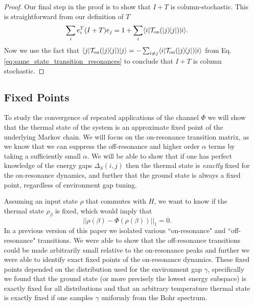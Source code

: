 \documentclass[
 amsmath,amssymb,
 aps,
onecolumn, 
nofootinbib]{revtex4-2}
\newcommand{\on}{\rm on}
\newcommand{\ket}[1]{|#1\rangle}
\newcommand{\bra}[1]{\langle #1|}
\newcommand{\ketbra}[2]{| #1\rangle\! \langle #2|}
\newcommand{\norm}[1]{\left|\left| #1 \right|\right|}
\newcommand{\TT}{\mathcal{T}}
\begin{document}
\begin{proof}
Our final step in the proof is to show that $I + T$ is column-stochastic. This is straightforward from our definition of $T$
\begin{equation}
    \sum_i e_i^T (I + T) e_j = 1 + \sum_i \bra{i} \mathcal{T}_{\on}(\ketbra{j}{j}) \ket{i}.
\end{equation}
Now we use the fact that $\bra{j} \TT_{\on}(\ketbra{j}{j}) \ket{j} = - \sum_{i \neq j} \bra{i} \TT_{\on}(\ketbra{j}{j}) \ket{i}$ from Eq. \eqref{eq:same_state_transition_resonances} to conclude that $I + T$ is column stochastic.
\end{proof}



\subsection{Fixed Points}

To study the convergence of repeated applications of the channel $\Phi$ we will show that the thermal state of the system is an approximate fixed point of the underlying Markov chain. We will focus on the on-resonance transition matrix, as we know that we can suppress the off-resonance and higher order $\alpha$ terms by taking a sufficiently small $\alpha$. We will be able to show that if one has perfect knowledge of the energy gaps $\Delta_S(i,j)$ then the thermal state is \emph{exactly} fixed for the on-resonance dynamics, and further that the ground state is always a fixed point, regardless of environment gap tuning. 

Assuming an input state $\rho$ that commutes with $H$, we want to know if the thermal state $\rho_\beta$ is fixed, which would imply that
\begin{equation}
    \norm{\rho(\beta) - \Phi(\rho(\beta))}_1 = 0.
\end{equation}
In a previous version of this paper we isolated various ``on-resonance" and ``off-resonance" transitions. We were able to show that the off-resonance transitions could be made arbitrarily small relative to the on-resonance peaks and further we were able to identify exact fixed points of the on-resonance dynamics. These fixed points depended on the distribution used for the environment gap $\gamma$, specifically we found that the ground state (or more precisely the lowest energy subspace) is exactly fixed for all distributions and that an arbitrary temperature thermal state is exactly fixed if one samples $\gamma$ uniformly from the Bohr spectrum. 
\end{document}
